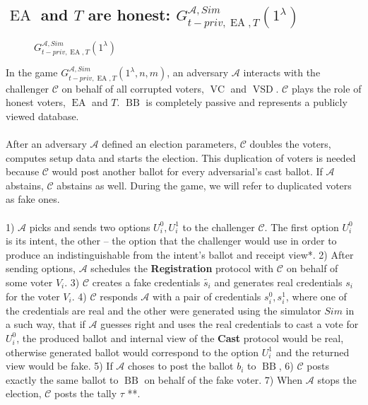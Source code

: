 \documentclass[12pt]{article}
\DeclareMathOperator{\vsd}{VSD}
\DeclareMathOperator{\ea}{EA}
\DeclareMathOperator{\bb}{BB}
\DeclareMathOperator{\voc}{VC}
\begin{document}
 \subsection{$\ea$ and $T$ are honest: $G_{t-priv,\ea,T}^{\mathcal{A}, Sim}(1^{\lambda})$}
  \begin{figure}
 
        \caption{  $G_{t-priv,\ea,T}^{\mathcal{A}, Sim}(1^{\lambda})$}
\end{figure}
 
In the game $G_{t-priv,\ea,T}^{\mathcal{A}, Sim}(1^{\lambda},n,m)$, an adversary $\mathcal{A}$ interacts with the challenger $\mathcal{C}$ on behalf of all corrupted voters, $\voc$ and $\vsd$. $\mathcal{C}$ plays the role of honest voters, $\ea$ and $T$. $\bb$ is completely passive and represents a publicly viewed database. \\\\
After an adversary  $\mathcal{A}$  defined an election parameters, $\mathcal{C}$  doubles the voters, computes setup data and starts the election. This duplication of voters is needed because $\mathcal{C}$ would post another ballot for every adversarial's cast ballot. If $\mathcal{A}$ abstains, $\mathcal{C}$ abstains as well. During the game, we will refer to duplicated voters as fake ones. \\\\
 1)  $\mathcal{A}$ picks and sends two options $U_i^0,U_i^1$ to the challenger $\mathcal{C}$. The first option $U_i^0$ is its intent, the other -- the option that the challenger would use in order to produce an indistinguishable from the intent's ballot and receipt view*. 2) After sending options, $\mathcal{A}$ schedules the   \textbf{Registration} protocol with $\mathcal{C}$ on behalf of some voter $V_i$. 3) $\mathcal{C}$ creates a fake credentials $\tilde{s_i}$ and generates real credentials $s_i$ for the voter $V_i$. 4) $\mathcal{C}$ responds $\mathcal{A}$ with a pair of credentials $s_i^0,s_i^1$, where one of the credentials are real and the other were generated using the simulator $Sim$ in a such way, that if $\mathcal{A}$ guesses right and uses the real credentials to cast a vote for $U_i^0$, the produced ballot and internal view of the \textbf{Cast} protocol would be real, otherwise generated ballot would correspond to the option $U_i^1$ and the returned view would be fake. 5) If $\mathcal{A}$ choses to post the ballot $b_i$ to $\bb$, 6) $\mathcal{C}$  posts exactly the same ballot to $\bb$ on behalf of the fake voter. 7) When $\mathcal{A}$ stops the election, $\mathcal{C}$ posts the tally $\tau$ **. \\\\
\end{document}
